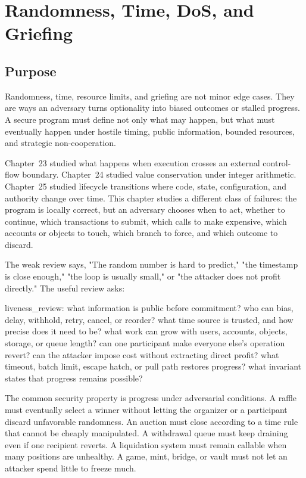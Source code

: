 \chapter{Randomness, Time, DoS, and Griefing}

\section{Purpose}

\begin{principlebox}
Randomness, time, resource limits, and griefing are not minor edge cases. They are ways an adversary turns optionality into biased outcomes or stalled progress. A secure program must define not only what may happen, but what must eventually happen under hostile timing, public information, bounded resources, and strategic non-cooperation.
\end{principlebox}

Chapter~23 studied what happens when execution crosses an external control-flow boundary. Chapter~24 studied value conservation under integer arithmetic. Chapter~25 studied lifecycle transitions where code, state, configuration, and authority change over time. This chapter studies a different class of failures: the program is locally correct, but an adversary chooses when to act, whether to continue, which transactions to submit, which calls to make expensive, which accounts or objects to touch, which branch to force, and which outcome to discard.

The weak review says, "The random number is hard to predict," "the timestamp is close enough," "the loop is usually small," or "the attacker does not profit directly." The useful review asks:

\begin{codeblock}
liveness_review:
    what information is public before commitment?
    who can bias, delay, withhold, retry, cancel, or reorder?
    what time source is trusted, and how precise does it need to be?
    what work can grow with users, accounts, objects, storage, or queue length?
    can one participant make everyone else's operation revert?
    can the attacker impose cost without extracting direct profit?
    what timeout, batch limit, escape hatch, or pull path restores progress?
    what invariant states that progress remains possible?
\end{codeblock}

The common security property is progress under adversarial conditions. A raffle must eventually select a winner without letting the organizer or a participant discard unfavorable randomness. An auction must close according to a time rule that cannot be cheaply manipulated. A withdrawal queue must keep draining even if one recipient reverts. A liquidation system must remain callable when many positions are unhealthy. A game, mint, bridge, or vault must not let an attacker spend little to freeze much.

